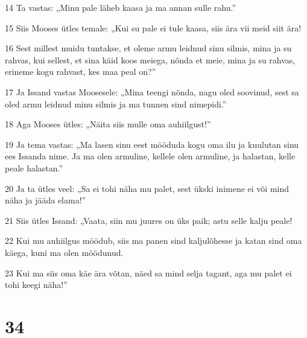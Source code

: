 \par 14 Ta vastas: „Minu pale läheb kaasa ja ma annan sulle rahu.”
\par 15 Siis Mooses ütles temale: „Kui su pale ei tule kaasa, siis ära vii meid siit ära!
\par 16 Sest millest muidu tuntakse, et oleme armu leidnud sinu silmis, mina ja su rahvas, kui sellest, et sina käid koos meiega, nõnda et meie, mina ja su rahvas, erineme kogu rahvast, kes maa peal on?”
\par 17 Ja Issand vastas Moosesele: „Mina teengi nõnda, nagu oled soovinud, sest sa oled armu leidnud minu silmis ja ma tunnen sind nimepidi.”
\par 18 Aga Mooses ütles: „Näita siis mulle oma auhiilgust!”
\par 19 Ja tema vastas: „Ma lasen sinu eest mööduda kogu oma ilu ja kuulutan sinu ees Issanda nime. Ja ma olen armuline, kellele olen armuline, ja halastan, kelle peale halastan.”
\par 20 Ja ta ütles veel: „Sa ei tohi näha mu palet, sest ükski inimene ei või mind näha ja jääda elama!”
\par 21 Siis ütles Issand: „Vaata, siin mu juures on üks paik; astu selle kalju peale!
\par 22 Kui mu auhiilgus möödub, siis ma panen sind kaljulõhesse ja katan sind oma käega, kuni ma olen möödunud.
\par 23 Kui ma siis oma käe ära võtan, näed sa mind selja tagant, aga mu palet ei tohi keegi näha!”

\chapter{34}

